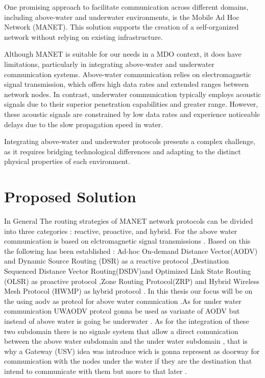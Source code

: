 \documentclass[]{nsm-thesis}
\begin{document}
One promising approach to facilitate communication across different domains, including above-water and underwater environments, is the Mobile Ad Hoc Network (MANET). This solution supports the creation of a self-organized network without relying on existing infrastructure.

Although MANET is suitable for our needs in a MDO context, it does have limitations, particularly in integrating above-water and underwater communication systems. Above-water communication relies on electromagnetic signal transmission, which offers high data rates and extended ranges between network nodes. In contrast, underwater communication typically employs acoustic signals due to their superior penetration capabilities and greater range. However, these acoustic signals are constrained by low data rates and experience noticeable delays due to the slow propagation speed in water.

Integrating above-water and underwater protocols presents a complex challenge, as it requires bridging technological differences and adapting to the distinct physical properties of each environment.
\section{Proposed Solution}
In General The routing strategies of MANET network protocols can be divided into three categories : reactive, proactive, and hybrid. For the above water communication is based on elctromagnetic signal transmissions . Based on this the following has been established : Ad-hoc On-demand Distance Vector(AODV) and  Dynamic Source Routing (DSR) as a reactive protocol ,Destination Sequenced Distance Vector Routing(DSDV)and Optimized Link State Routing (OLSR) as proactive protocol ,Zone Routing Protocol(ZRP) and Hybrid Wireless Mesh Protocol (HWMP) as hybrid protocol . In this thesis our focus will be on the using  aodv as protcol for above water comunication .As for under water communication UWAODV protcol gonna be used as variante of AODV but instead of above water is going be underwater . As for the integration of these two subdomain  there is no signale system that allow a direct   comunication between the above water subdomain and the under water subdomain , that is why a Gateway (USV) idea was introduce wich is gonna represent as doorway for communication with the nodes under the water if they are the destination that intend to communicate with them but more to that later .
\end{document}
